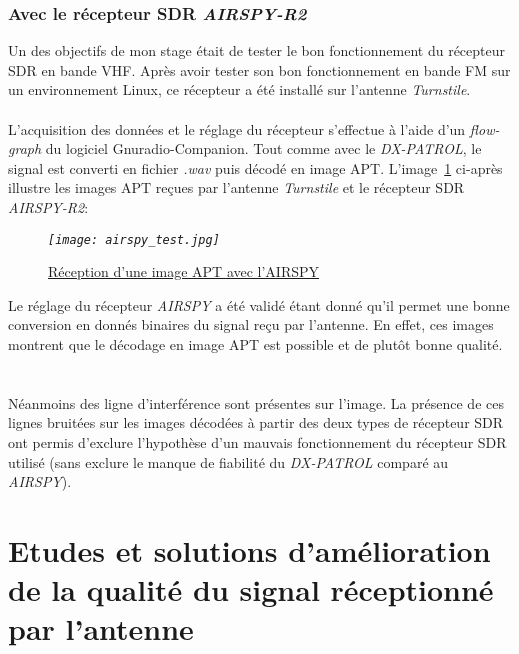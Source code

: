 \documentclass[12pt,fleqn]{book} %
\begin{document}
\subsection{Avec le récepteur SDR \emph{AIRSPY-R2}}
Un des objectifs de mon stage était de tester le bon fonctionnement du récepteur SDR en bande VHF. Après avoir tester son bon fonctionnement en bande FM sur un environnement Linux, ce récepteur a été installé sur l'antenne \emph{Turnstile}.
~\\\\L'acquisition des données et le réglage du récepteur s'effectue à l'aide d'un \emph{flow-graph} du logiciel Gnuradio-Companion. Tout comme avec le \emph{DX-PATROL}, le signal est converti en fichier \emph{.wav} puis décodé en image APT. L'image~\ref{airspy_test} ci-après illustre les images APT reçues par l'antenne \emph{Turnstile} et le récepteur SDR \emph{AIRSPY-R2}:
\begin{figure}[H]
	\centering
	\itshape
	\texttt{[image: airspy\_test.jpg]}
	\caption{\label{airspy_test} \underline{Réception d'une image APT avec l'AIRSPY}}
\end{figure}
Le réglage du récepteur \emph{AIRSPY} a été validé étant donné qu'il permet une bonne conversion en donnés binaires du signal reçu par l'antenne. En effet, ces images montrent que le décodage en image APT est possible et de plutôt bonne qualité.
~\\\\Néanmoins des ligne d'interférence sont présentes sur l'image. La présence de ces lignes bruitées sur les images décodées à partir des deux types de récepteur SDR ont permis d'exclure l'hypothèse d'un mauvais fonctionnement du récepteur SDR utilisé (sans exclure le manque de fiabilité du \emph{DX-PATROL} comparé au \emph{AIRSPY}). 
\chapter{Etudes et solutions d'amélioration de la qualité du signal réceptionné par l'antenne}
\end{document}
